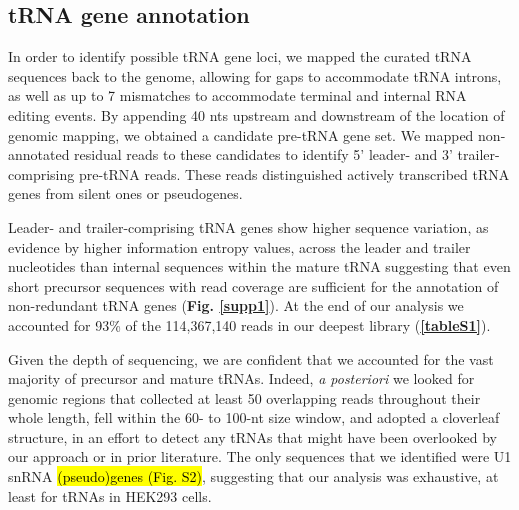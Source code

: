 \documentclass[12pt]{rockefeller}
\begin{document}
\subsection{tRNA gene annotation}
In order to identify possible tRNA gene loci, we mapped the curated tRNA sequences back to the genome, allowing for gaps to accommodate tRNA introns, as well as up to 7 mismatches to accommodate terminal and internal RNA editing events. By appending 40 nts upstream and downstream of the location of genomic mapping, we obtained a candidate pre-tRNA gene set. We mapped non-annotated residual reads to these candidates to identify 5’ leader- and 3’ trailer-comprising pre-tRNA reads. These reads distinguished actively transcribed tRNA genes from silent ones or pseudogenes.

Leader- and trailer-comprising tRNA genes show higher sequence variation, as evidence by higher information entropy values, across the leader and trailer nucleotides than internal sequences within the mature tRNA suggesting that even short precursor sequences with read coverage are sufficient for the annotation of non-redundant tRNA genes (\textbf{Fig. \ref{supp1}}). At the end of our analysis we accounted for 93\% of the 114,367,140 reads in our deepest library (\textbf{\ref{tableS1}}).

Given the depth of sequencing, we are confident that we accounted for the vast majority of precursor and mature tRNAs. Indeed, \textit{a posteriori} we looked for genomic regions that collected at least 50 overlapping reads throughout their whole length, fell within the 60- to 100-nt size window, and adopted a cloverleaf structure, in an effort to detect any tRNAs that might have been overlooked by our approach or in prior literature. The only sequences that we identified were U1 snRNA \hl{(pseudo)genes (Fig. S2)}, suggesting that our analysis was exhaustive, at least for tRNAs in HEK293 cells. 
\end{document}
